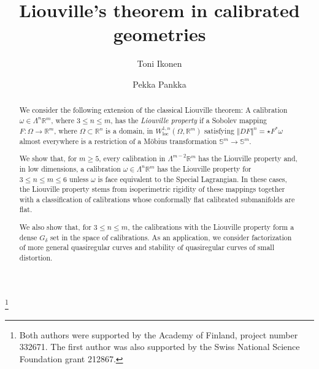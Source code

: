 \documentclass[a4paper,leqno,11pt]{amsart}
\numberwithin{equation}{section}
\theoremstyle{remark}
\theoremstyle{remark}
\DeclareMathOperator{\loc}{loc}
\newcommand{\norm}[1]{ \left\Vert #1 \right\Vert }	%
\begin{document}
\title{Liouville's theorem in calibrated geometries}

\author{Toni Ikonen} 
\address{Department of Mathematics, University of Fribourg, Chemin du Musée 23, 1700 Fribourg, Switzerland.}


\author{Pekka Pankka} 
\address{Department of Mathematics and Statistics, P. O. Box 68 (Pietari Kalmin katu 5), FI-00014 University of Helsinki, Finland}


\thanks{Both authors were supported by the Academy of Finland, project number 332671. The first author was also supported by the Swiss National Science Foundation grant 212867.}


\begin{abstract}
We consider the following extension of the classical Liouville theorem: A calibration $\omega \in \Lambda^n \mathbb{R}^m$, where $3 \le n \le m$, has the \emph{Liouville property} if a Sobolev mapping $F\colon \Omega \to \mathbb{R}^m$, where $\Omega \subset \mathbb{R}^n$ is a domain, in $W^{1,n}_{\loc}( \Omega, \mathbb{R}^m )$ satisfying $\norm{DF}^n = \star F^{*}\omega$ almost everywhere is a restriction of a M\"obius transformation $\mathbb{S}^m \to \mathbb{S}^m$. 

We show that, for $m\ge 5$, every calibration in $\Lambda^{m-2} \mathbb{R}^m$ has the Liouville property and, in low dimensions, a calibration $\omega \in \Lambda^n \mathbb{R}^m$ has the Liouville property for $3 \le n \le m \le 6$ unless $\omega$ is face equivalent to the Special Lagrangian. In these cases, the Liouville property stems from isoperimetric rigidity of these mappings together with a classification of calibrations whose conformally flat calibrated submanifolds are flat.

We also show that, for $3 \leq n \leq m$, the calibrations with the Liouville property form a dense $G_\delta$ set in the space of calibrations. As an application, we consider factorization of more general quasiregular curves and stability of quasiregular curves of small distortion.
\end{abstract}
\end{document}
